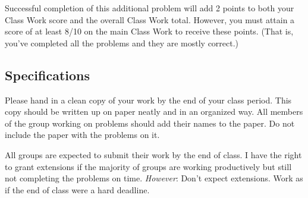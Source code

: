 \documentclass[11pt]{article}
\begin{document}
Successful completion of this additional problem will add 2 points to both your Class Work score and the overall Class Work total. However, you must attain a score of at least 8/10 on the main Class Work to receive these points. (That is, you've completed all the problems and they are mostly correct.) 	
	
\subsection*{Specifications}

Please hand in a clean copy of your work by the end of your class period. This copy should be written up on paper neatly and in an organized way. All members of the group working on problems should add their names to the paper. Do not include the paper with the problems on it. 

All groups are expected to submit their work by the end of class. I have the right to grant extensions if the majority of groups are working productively but still not completing the problems on time. \emph{However}: Don't expect extensions. Work as if the end of class were a hard deadline. 
\end{document}
